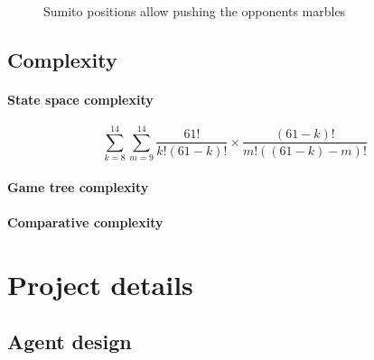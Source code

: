 \documentclass{llncs}
\begin{document}
\begin{figure}[!h]
  \centering
  \hfill
  \hfill
  \caption{Sumito positions allow pushing the opponents marbles \cite{abalone_sa_abalone_nodate}}
\end{figure}

\subsection{Complexity}

\paragraph{State space complexity}

$$
  \sum_{k=8}^{14}\sum_{m=9}^{14}\frac{61!}{k!(61-k)!}\times\frac{(61-k)!}{m!((61-k)-m)!}
$$

\paragraph{Game tree complexity}

\paragraph{Comparative complexity}

\section{Project details}

\subsection{Agent design}
\end{document}
